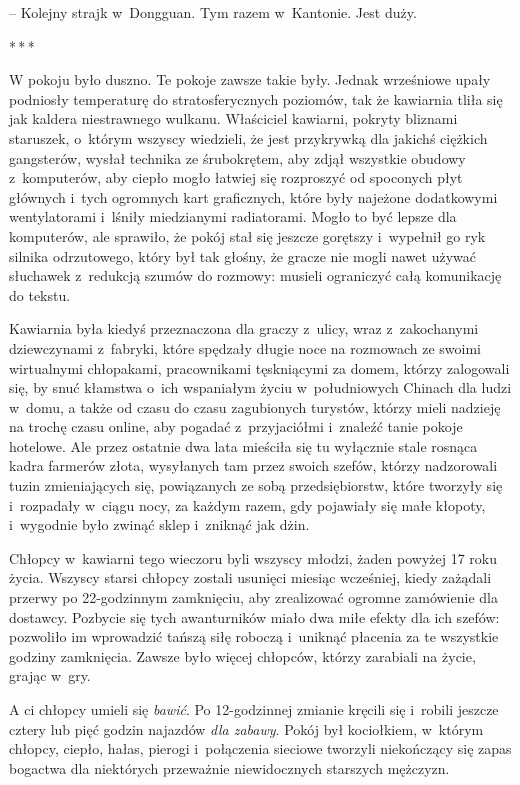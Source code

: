 \documentclass[oneside,polish,11pt,rmheadings]{mwbk}
\newcommand{\threeast}{\par\centerline{*\,*\,*}\medskip\par}
\begin{document}
-- Kolejny strajk w~Dongguan. Tym razem w~Kantonie. Jest duży.

\bigskip
\threeast

W pokoju było duszno. Te pokoje zawsze takie były. Jednak wrześniowe upały podniosły temperaturę do stratosferycznych poziomów, tak że kawiarnia tliła się jak kaldera niestrawnego wulkanu. Właściciel kawiarni, pokryty bliznami staruszek, o~którym wszyscy wiedzieli, że jest przykrywką dla jakichś ciężkich gangsterów, wysłał technika ze śrubokrętem, aby zdjął wszystkie obudowy z~komputerów, aby ciepło mogło łatwiej się rozproszyć od spoconych płyt głównych i~tych ogromnych kart graficznych, które były najeżone dodatkowymi wentylatorami i~lśniły miedzianymi radiatorami. Mogło to być lepsze dla komputerów, ale sprawiło, że pokój stał się jeszcze gorętszy i~wypełnił go ryk silnika odrzutowego, który był tak głośny, że gracze nie mogli nawet używać słuchawek z~redukcją szumów do rozmowy: musieli ograniczyć całą komunikację do tekstu.

Kawiarnia była kiedyś przeznaczona dla graczy z~ulicy, wraz z~zakochanymi dziewczynami z~fabryki, które spędzały długie noce na rozmowach ze swoimi wirtualnymi chłopakami, pracownikami tęskniącymi za domem, którzy zalogowali się, by snuć kłamstwa o~ich wspaniałym życiu w~południowych Chinach dla ludzi w~domu, a także od czasu do czasu zagubionych turystów, którzy mieli nadzieję na trochę czasu online, aby pogadać z~przyjaciółmi i~znaleźć tanie pokoje hotelowe. Ale przez ostatnie dwa lata mieściła się tu wyłącznie stale rosnąca kadra farmerów złota, wysyłanych tam przez swoich szefów, którzy nadzorowali tuzin zmieniających się, powiązanych ze sobą przedsiębiorstw, które tworzyły się i~rozpadały w~ciągu nocy, za każdym razem, gdy pojawiały się małe kłopoty, i~wygodnie było zwinąć sklep i~zniknąć jak dżin.

Chłopcy w~kawiarni tego wieczoru byli wszyscy młodzi, żaden powyżej 17 roku życia. Wszyscy starsi chłopcy zostali usunięci miesiąc wcześniej, kiedy zażądali przerwy po 22-godzinnym zamknięciu, aby zrealizować ogromne zamówienie dla dostawcy. Pozbycie się tych awanturników miało dwa miłe efekty dla ich szefów: pozwoliło im wprowadzić tańszą siłę roboczą i~uniknąć płacenia za te wszystkie godziny zamknięcia. Zawsze było więcej chłopców, którzy zarabiali na życie, grając w~gry.

A ci chłopcy umieli się \textit{bawić}. Po 12-godzinnej zmianie kręcili się i~robili jeszcze cztery lub pięć godzin najazdów \textit{dla zabawy}. Pokój był kociołkiem, w~którym chłopcy, ciepło, hałas, pierogi i~połączenia sieciowe tworzyli niekończący się zapas bogactwa dla niektórych przeważnie niewidocznych starszych mężczyzn.
\end{document}
